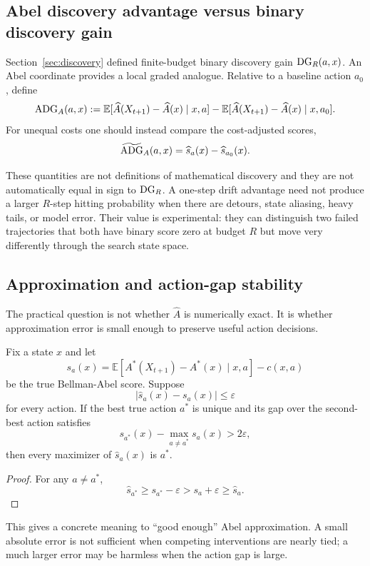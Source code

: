 \subsection{Abel discovery advantage versus binary discovery gain}
Section~\ref{sec:discovery} defined finite-budget binary discovery gain $\operatorname{DG}_R(a,x)$. An Abel coordinate provides a local graded analogue. Relative to a baseline action $a_0$, define
\[
\operatorname{ADG}_A(a,x)
:=
\mathbb E[\widehat A(X_{t+1})-\widehat A(x)\mid x,a]
-
\mathbb E[\widehat A(X_{t+1})-\widehat A(x)\mid x,a_0].
\]
For unequal costs one should instead compare the cost-adjusted scores,
\[
\widetilde{\operatorname{ADG}}_A(a,x)=\widehat s_a(x)-\widehat s_{a_0}(x).
\]

These quantities are not definitions of mathematical discovery and they are not automatically equal in sign to $\operatorname{DG}_R$. A one-step drift advantage need not produce a larger $R$-step hitting probability when there are detours, state aliasing, heavy tails, or model error. Their value is experimental: they can distinguish two failed trajectories that both have binary score zero at budget $R$ but move very differently through the search state space.

\subsection{Approximation and action-gap stability}
The practical question is not whether $\widehat A$ is numerically exact. It is whether approximation error is small enough to preserve useful action decisions.

\begin{proposition}
Fix a state $x$ and let
\[
s_a(x)=\mathbb E[A^*(X_{t+1})-A^*(x)\mid x,a]-c(x,a)
\]
be the true Bellman-Abel score. Suppose
\[
|\widehat s_a(x)-s_a(x)|\le\varepsilon
\]
for every action. If the best true action $a^*$ is unique and its gap over the second-best action satisfies
\[
s_{a^*}(x)-\max_{a\ne a^*}s_a(x)>2\varepsilon,
\]
then every maximizer of $\widehat s_a(x)$ is $a^*$.
\end{proposition}

\begin{proof}
For any $a\ne a^*$,
\[
\widehat s_{a^*}\ge s_{a^*}-\varepsilon
> s_a+\varepsilon
\ge\widehat s_a.
\]
\end{proof}

This gives a concrete meaning to ``good enough'' Abel approximation. A small absolute error is not sufficient when competing interventions are nearly tied; a much larger error may be harmless when the action gap is large.

